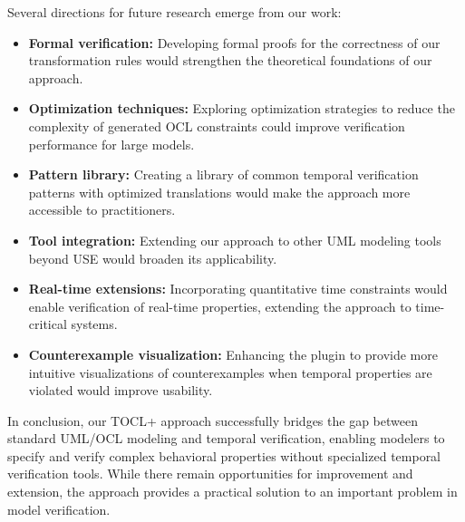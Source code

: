 Several directions for future research emerge from our work:

\begin{itemize}
    \item \textbf{Formal verification:} Developing formal proofs for the correctness 
    of our transformation rules would strengthen the theoretical foundations of our 
    approach.

    \item \textbf{Optimization techniques:} Exploring optimization strategies to 
    reduce the complexity of generated OCL constraints could improve verification 
    performance for large models.

    \item \textbf{Pattern library:} Creating a library of common temporal verification 
    patterns with optimized translations would make the approach more accessible to 
    practitioners.

    \item \textbf{Tool integration:} Extending our approach to other UML modeling 
    tools beyond USE would broaden its applicability.

    \item \textbf{Real-time extensions:} Incorporating quantitative time constraints 
    would enable verification of real-time properties, extending the approach to 
    time-critical systems.

    \item \textbf{Counterexample visualization:} Enhancing the plugin to provide 
    more intuitive visualizations of counterexamples when temporal properties are 
    violated would improve usability.
\end{itemize}

In conclusion, our TOCL+ approach successfully bridges the gap between standard 
UML/OCL modeling and temporal verification, enabling modelers to specify and verify 
complex behavioral properties without specialized temporal verification tools. While 
there remain opportunities for improvement and extension, the approach provides a 
practical solution to an important problem in model verification.
